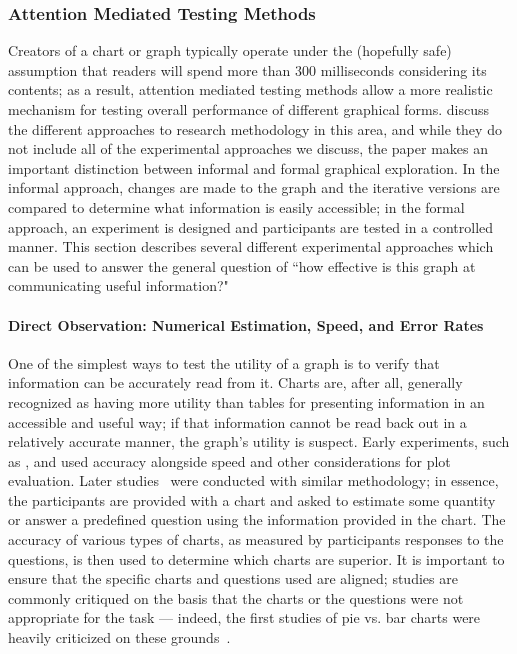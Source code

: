 \documentclass[letterpaper]{ar-1col}\usepackage[]{graphicx}\usepackage[]{color}
\begin{document}
\subsubsection{Attention Mediated Testing Methods}
Creators of a chart or graph typically operate under the (hopefully safe) assumption that readers will spend more than 300 milliseconds considering its contents; as a result, attention mediated testing methods allow a more realistic mechanism for testing overall performance of different graphical forms. \citet{clevelandGraphicalPerceptionVisual1987} discuss the different approaches to research methodology in this area, and while they do not include all of the experimental approaches we discuss, the paper makes an important distinction between informal and formal graphical exploration. In the informal approach, changes are made to the graph and the iterative versions are compared to determine what information is easily accessible; in the formal approach, an experiment is designed and participants are tested in a controlled manner. This section describes several different experimental approaches which can be used to answer the general question of ``how effective is this graph at communicating useful information?"

\paragraph{Direct Observation: Numerical Estimation, Speed, and Error Rates} %
One of the simplest ways to test the utility of a graph is to verify that information can be accurately read from it. Charts are, after all, generally recognized as having more utility than tables for presenting information in an accessible and useful way; if that information cannot be read back out in a relatively accurate manner, the graph's utility is suspect. Early experiments, such as \citet{eellsRelativeMeritsCircles1926}, \citet{croxtonBarChartsCircle1927} and \citet{croxtonGraphicComparisonsBars1932} used accuracy alongside speed and other considerations for plot evaluation. Later studies~\citep{petersonHowAccuratelyAre1954,cleveland_graphical_1984,broersmaGraphicalPerceptionDistributional,dunnFramedRectangleCharts1988,tanHumanProcessingTwodimensional1994,amerBiasDueVisual2005} were conducted with similar methodology; in essence, the participants are provided with a chart and asked to estimate some quantity or answer a predefined question using the information provided in the chart. The accuracy of various types of charts, as measured by participants responses to the questions, is then used to determine which charts are superior. It is important to ensure that the specific charts and questions used are aligned; studies are commonly critiqued on the basis that the charts or the questions were not appropriate for the task  --- indeed, the first studies of pie vs. bar charts were heavily criticized on these grounds~\citep{vonhuhnFurtherStudiesGraphic1927}.
\end{document}
